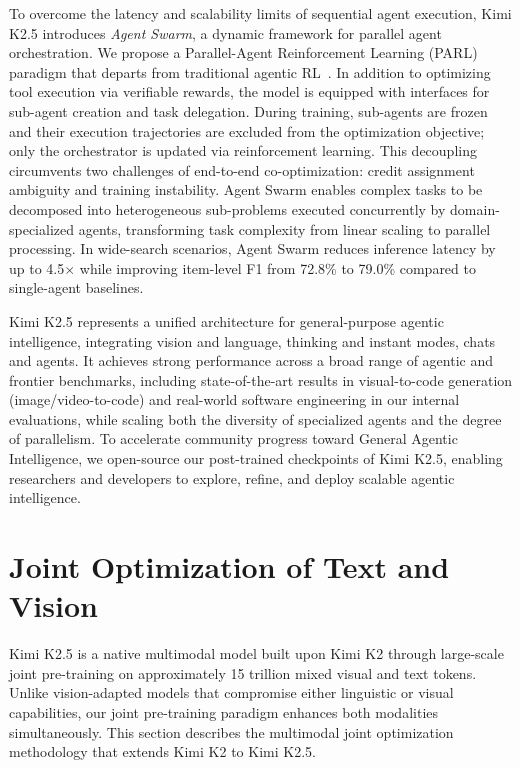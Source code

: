\documentclass{article}
\newcommand{\citep}[1]{\parencite{#1}}
\begin{document}
To overcome the latency and scalability limits of sequential agent execution, Kimi K2.5 introduces \textit{Agent Swarm}, a dynamic framework for parallel agent orchestration. We propose a Parallel-Agent Reinforcement Learning (PARL) paradigm that departs from traditional agentic RL~\citep{moonshotai2025kimiresearcher}. In addition to optimizing tool execution via verifiable rewards, the model is equipped with interfaces for sub-agent creation and task delegation.  During training, sub-agents are frozen and their execution trajectories are excluded from the optimization objective; only the orchestrator is updated via reinforcement learning. This decoupling circumvents two challenges of end-to-end co-optimization: credit assignment ambiguity and training instability. Agent Swarm enables complex tasks to be decomposed into heterogeneous sub-problems executed concurrently by domain-specialized agents, transforming task complexity from linear scaling to parallel processing. In wide-search scenarios, Agent Swarm reduces inference latency by up to 4.5$\times$ while improving item-level F1 from 72.8\% to 79.0\% compared to single-agent baselines.

Kimi K2.5 represents a unified architecture for general-purpose agentic intelligence, integrating vision and language, thinking and instant modes, chats and agents. It achieves strong performance across a broad range of agentic and frontier benchmarks, including state-of-the-art results in visual-to-code generation (image/video-to-code) and real-world software engineering in our internal evaluations, while scaling both the diversity of specialized agents and the degree of parallelism. To accelerate community progress toward General Agentic Intelligence, we open-source our post-trained checkpoints of Kimi K2.5, enabling researchers and developers to explore, refine, and deploy scalable agentic intelligence.

\section{Joint Optimization of Text and Vision}

Kimi K2.5 is a native multimodal model built upon Kimi K2 through large-scale joint pre-training on approximately 15 trillion mixed visual and text tokens. Unlike vision-adapted models that compromise either linguistic or visual capabilities, our joint pre-training paradigm enhances both modalities simultaneously. This section describes the multimodal joint optimization methodology that extends Kimi K2 to Kimi K2.5.
\end{document}
